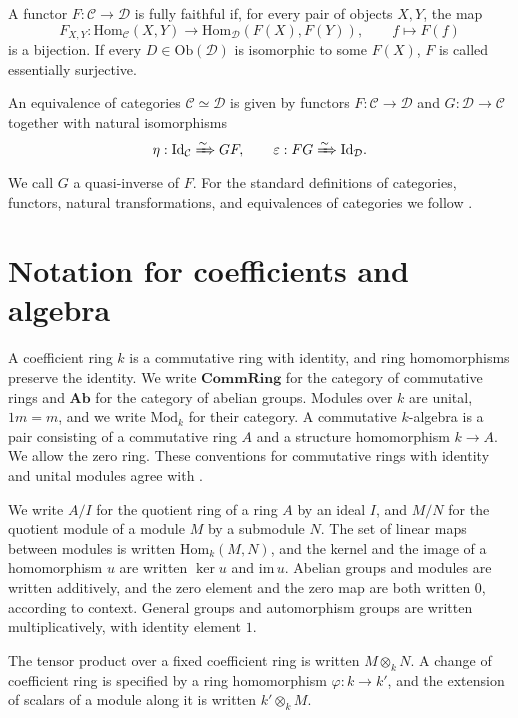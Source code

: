 A functor $F:\mathcal{C}\to\mathcal{D}$ is fully faithful if, for every pair
of objects $X,Y$, the map
\[
F_{X,Y}:\mathrm{Hom}_{\mathcal{C}}(X,Y)
\longrightarrow\mathrm{Hom}_{\mathcal{D}}(F(X),F(Y)),
\qquad f\longmapsto F(f)
\]
is a bijection. If every $D\in\mathrm{Ob}(\mathcal{D})$ is isomorphic to some
$F(X)$, $F$ is called essentially surjective.

An equivalence of categories $\mathcal{C}\simeq\mathcal{D}$ is given by
functors $F:\mathcal{C}\to\mathcal{D}$ and $G:\mathcal{D}\to\mathcal{C}$
together with natural isomorphisms
\[
\eta:\mathrm{Id}_{\mathcal{C}}\xRightarrow{\sim}GF,
\qquad
\varepsilon:FG\xRightarrow{\sim}\mathrm{Id}_{\mathcal{D}}.
\]
We call $G$ a quasi-inverse of $F$. For the standard definitions of
categories, functors, natural transformations, and equivalences of categories
we follow
\cite[\href{https://stacks.math.columbia.edu/tag/0013}{Tag~0013}]{Stacks}.

\section{Notation for coefficients and algebra}\label{sec:P.4}

A coefficient ring $k$ is a commutative ring with identity, and ring
homomorphisms preserve the identity. We write ${\mathbf{CommRing}}$ for the
category of commutative rings and ${\mathbf{Ab}}$ for the category of abelian
groups. Modules over $k$ are unital, $1m=m$, and we write $\mathrm{Mod}_k$ for
their category. A commutative $k$-algebra is a pair consisting of a commutative ring $A$
and a structure homomorphism $k\to A$. We allow the zero ring. These
conventions for commutative rings with identity and unital modules agree with
\cite[\href{https://stacks.math.columbia.edu/tag/0006}{Tag~0006},
\href{https://stacks.math.columbia.edu/tag/00AQ}{Tag~00AQ}]{Stacks}.

We write $A/I$ for the quotient ring of a ring $A$ by an ideal $I$, and $M/N$
for the quotient module of a module $M$ by a submodule $N$. The set of linear
maps between modules is written $\mathrm{Hom}_k(M,N)$, and the kernel and the
image of a homomorphism $u$ are written $\ker u$ and $\mathrm{im}\,u$. Abelian
groups and modules are written additively, and the zero element and the zero
map are both written $0$, according to context. General groups and
automorphism groups are written multiplicatively, with identity element $1$.

The tensor product over a fixed coefficient ring is written $M\otimes_k N$. A
change of coefficient ring is specified by a ring homomorphism
$\varphi:k\to k'$, and the extension of scalars of a module along it is
written $k'\otimes_k M$.

